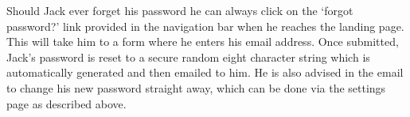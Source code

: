     Should Jack ever forget his password he can always click on the `forgot password?' link provided in the navigation bar when he reaches the landing page. This will take him to a form where he enters his email address. Once submitted, Jack's password is reset to a secure random eight character string which is automatically generated and then emailed to him. He is also advised in the email to change his new password straight away, which can be done via the settings page as described above.